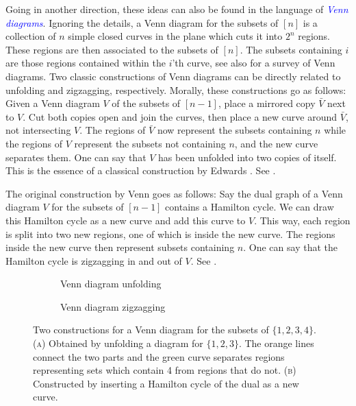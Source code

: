 \documentclass[fontsize=11pt,a4paper,DIV=12]{scrartcl}
\newcommand{\defn}[1]{\textsl{\textcolor{Blue}{#1}}}
\begin{document}
Going in another direction, these ideas can also be found in the language of \defn{Venn diagrams}. Ignoring the details, a Venn diagram for the subsets of $[n]$ is a collection of $n$ simple closed curves in the plane which cuts it into $2^n$ regions. These regions are then associated to the subsets of $[n]$. The subsets containing $i$ are those regions contained within the $i$'th curve, see also \cite{Survey_Venn} for a survey of Venn diagrams. Two classic constructions of Venn diagrams can be directly related to unfolding and zigzagging, respectively. Morally, these constructions go as follows: Given a Venn diagram $V$ of the subsets of $[n-1]$, place a mirrored copy $\bar{V}$ next to $V$. Cut both copies open and join the curves, then place a new curve around $\bar V$, not intersecting $V$. The regions of $\bar V$ now represent the subsets containing $n$ while the regions of $V$ represent the subsets not containing $n$, and the new curve separates them. One can say that $V$ has been unfolded into two copies of itself. This is the essence of a classical construction by Edwards \cite{Edwards1989}. See .

The original construction by Venn \cite{Venn1880} goes as follows: Say the dual graph of a Venn diagram $V$ for the subsets of $[n-1]$ contains a Hamilton cycle. We can draw this Hamilton cycle as a new curve and add this curve to $V$. This way, each region is split into two new regions, one of which is inside the new curve. The regions inside the new curve then represent subsets containing $n$. One can say that the Hamilton cycle is zigzagging in and out of $V$. See .

\begin{figure}[htbp]
	\centering
	\begin{subfigure}[b]{0.48\textwidth}
		\centering
		
		\caption{Venn diagram unfolding}
		\label{fig:venn unfolding}
	\end{subfigure}
	\hfill
	\begin{subfigure}[b]{0.48\textwidth}
		\centering
		
		\caption{Venn diagram zigzagging}
		\label{fig:venn zigzagging}
	\end{subfigure}

	\caption{Two constructions for a Venn diagram for the subsets of $\{1,2,3,4\}$. (\textsc{a}) Obtained by unfolding a diagram for $\{1,2,3\}$. The orange lines connect the two parts and the green curve separates regions representing sets which contain 4 from regions that do not. (\textsc{b}) Constructed by inserting a Hamilton cycle of the dual as a new curve.}
	\label{fig:combined_venn}
\end{figure}
\end{document}
